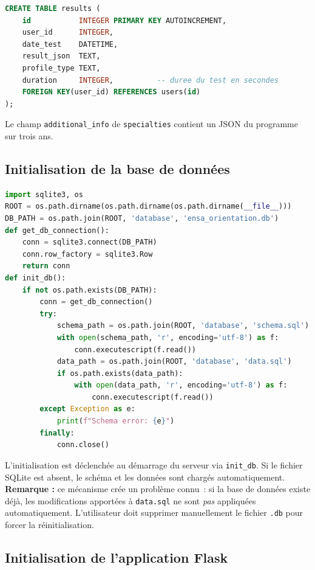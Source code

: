 \documentclass[a4paper,12pt]{article}
\begin{document}
\begin{lstlisting}[language=SQL, caption={Schéma SQL complet (schema.sql)}, captionpos=b, firstnumber=30]
CREATE TABLE results (
    id           INTEGER PRIMARY KEY AUTOINCREMENT,
    user_id      INTEGER,
    date_test    DATETIME,
    result_json  TEXT,
    profile_type TEXT,
    duration     INTEGER,          -- duree du test en secondes
    FOREIGN KEY(user_id) REFERENCES users(id)
);
\end{lstlisting}
Le champ \texttt{additional\_info} de \texttt{specialties} contient un JSON du programme sur trois ans.
\subsection{Initialisation de la base de données}
\begin{lstlisting}[language=Python, caption={Initialisation de la base de données (database.py)},captionpos=b]
import sqlite3, os
ROOT = os.path.dirname(os.path.dirname(os.path.dirname(__file__)))
DB_PATH = os.path.join(ROOT, 'database', 'ensa_orientation.db')
def get_db_connection():
    conn = sqlite3.connect(DB_PATH)
    conn.row_factory = sqlite3.Row
    return conn
def init_db():
    if not os.path.exists(DB_PATH):
        conn = get_db_connection()
        try:
            schema_path = os.path.join(ROOT, 'database', 'schema.sql')
            with open(schema_path, 'r', encoding='utf-8') as f:
                conn.executescript(f.read())
            data_path = os.path.join(ROOT, 'database', 'data.sql')
            if os.path.exists(data_path):
                with open(data_path, 'r', encoding='utf-8') as f:
                    conn.executescript(f.read())
        except Exception as e:
            print(f"Schema error: {e}")
        finally:
            conn.close()
\end{lstlisting}
L'initialisation est déclenchée au démarrage du serveur via \texttt{init\_db}.
Si le fichier SQLite est absent, le schéma et les données sont chargés automatiquement.
\noindent\textbf{Remarque :} ce mécanisme crée un problème connu~: si la base de données
existe déjà, les modifications apportées à \texttt{data.sql} ne sont \emph{pas} appliquées
automatiquement. L'utilisateur doit supprimer manuellement le fichier \texttt{.db} pour
forcer la réinitialisation.

\subsection{Initialisation de l'application Flask}
\end{document}
